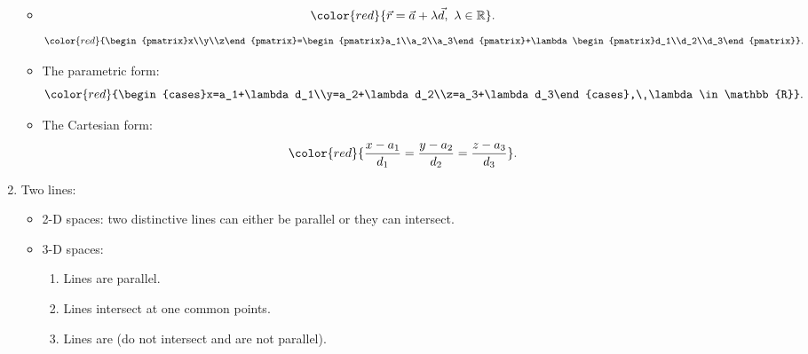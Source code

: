 \documentclass[12pt, a4paper]{article}
\def\d{{\mathrm{d}}}
\begin{document}
\begin{enumerate}
\begin{itemize}
    \item $${\color{red}{\vec{r}=\vec{a}+\lambda\vec{d},\ \lambda\in\mathbb{R}}}.$$
    $${\color{red}{\begin{pmatrix}x\\y\\z\end{pmatrix}=\begin{pmatrix}a_1\\a_2\\a_3\end{pmatrix}+\lambda\begin{pmatrix}d_1\\d_2\\d_3\end{pmatrix}}}.$$
    \item The parametric form: 
    $${\color{red}{\begin{cases}x=a_1+\lambda d_1\\y=a_2+\lambda d_2\\z=a_3+\lambda d_3\end{cases},\ \lambda\in\mathbb{R}}}.$$
    \item The Cartesian form: 
    $${\color{red}{\frac{x-a_1}{d_1}=\frac{y-a_2}{d_2}=\frac{z-a_3}{d_3}}}.$$
  \end{itemize}
  \item Two lines: 
  \begin{itemize}
    \item 2-D spaces: two distinctive lines can either be parallel or they can intersect. 
    \item 3-D spaces: 
    \begin{enumerate}
      \item Lines are parallel.
      \item Lines intersect at one common points.
      \item Lines are \textbf{\color{red}{skewed}} (do not intersect and are not parallel).
    \end{enumerate}
  \end{itemize}
\end{enumerate}
\end{document}
